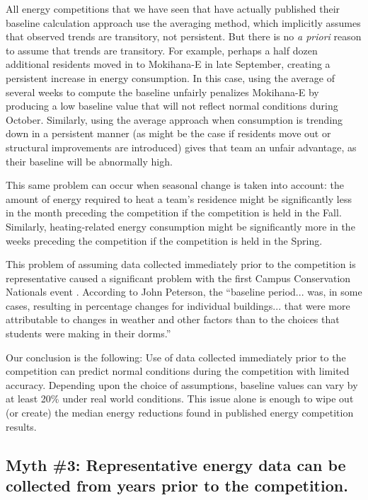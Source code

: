 \documentclass[jou]{apa} %
\begin{document}
All energy competitions that we have seen that have actually published their baseline
calculation approach use the averaging method, which implicitly assumes that observed
trends are transitory, not persistent.  But there is no {\em a priori} reason to assume
that trends are transitory.  For example, perhaps a half dozen additional residents moved
in to Mokihana-E in late September, creating a persistent increase in energy consumption.
In this case, using the average of several weeks to compute the baseline unfairly
penalizes Mokihana-E by producing a low baseline value that will not reflect normal
conditions during October.  Similarly, using the average approach when consumption is
trending down in a persistent manner (as might be the case if residents move out or
structural improvements are introduced) gives that team an unfair advantage, as their
baseline will be abnormally high.

This same problem can occur when seasonal change is taken into account: the amount of
energy required to heat a team's residence might be significantly less in the month
preceding the competition if the competition is held in the Fall. Similarly,
heating-related energy consumption might be significantly more in the weeks preceding the
competition if the competition is held in the Spring.  

This problem of assuming data collected immediately prior to the competition is
representative caused a significant problem with the first Campus Conservation
Nationals event \cite{Willens2010}.  According to John Peterson, the ``baseline
period... was, in some cases, resulting in percentage changes for individual
buildings... that were more attributable to changes in weather and other factors than to
the choices that students were making in their dorms.''

Our conclusion is the following: Use of data collected immediately prior to the
competition can predict normal conditions during the competition with limited
accuracy. Depending upon the choice of assumptions, baseline values can vary by at least
20\% under real world conditions.  This issue alone is enough to wipe out (or create) the median
energy reductions found in published energy competition results.

\subsection{Myth \#3: Representative energy data can be collected from years prior to the competition.}
\end{document}

